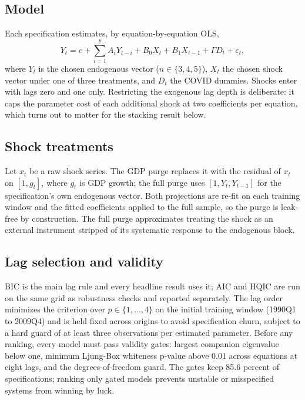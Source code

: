 \documentclass[conference]{IEEEtran}
\begin{document}
\subsection{Model}
Each specification estimates, by equation-by-equation OLS,
\begin{equation}
Y_t = c + \sum_{i=1}^{p} A_i Y_{t-i} + B_0 X_t + B_1 X_{t-1} + \Gamma D_t + \varepsilon_t,
\end{equation}
where $Y_t$ is the chosen endogenous vector ($n \in \{3,4,5\}$), $X_t$ the chosen shock vector under one of three treatments, and $D_t$ the COVID dummies. Shocks enter with lags zero and one only. Restricting the exogenous lag depth is deliberate: it caps the parameter cost of each additional shock at two coefficients per equation, which turns out to matter for the stacking result below.

\subsection{Shock treatments}
Let $x_t$ be a raw shock series. The GDP purge replaces it with the residual of $x_t$ on $[1, g_t]$, where $g_t$ is GDP growth; the full purge uses $[1, Y_t, Y_{t-1}]$ for the specification's own endogenous vector. Both projections are re-fit on each training window and the fitted coefficients applied to the full sample, so the purge is leak-free by construction. The full purge approximates treating the shock as an external instrument stripped of its systematic response to the endogenous block.

\subsection{Lag selection and validity}
BIC is the main lag rule and every headline result uses it; AIC and HQIC are run on the same grid as robustness checks and reported separately. The lag order minimizes the criterion over $p \in \{1,\dots,4\}$ on the initial training window (1990Q1 to 2009Q4) and is held fixed across origins to avoid specification churn, subject to a hard guard of at least three observations per estimated parameter. Before any ranking, every model must pass validity gates: largest companion eigenvalue below one, minimum Ljung-Box whiteness p-value above 0.01 across equations at eight lags, and the degrees-of-freedom guard. The gates keep 85.6 percent of specifications; ranking only gated models prevents unstable or misspecified systems from winning by luck.
\end{document}
